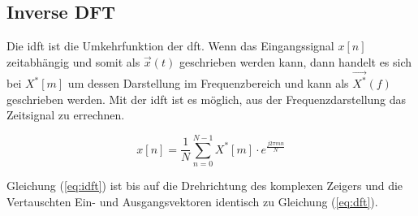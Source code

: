 \subsection{Inverse DFT}

Die \gls{idft} ist die Umkehrfunktion der \gls{dft}. Wenn das Eingangssignal $x[n]$ zeitabhängig und somit als $\vec{x}(t)$ geschrieben werden kann, dann handelt es sich bei $X^*[m]$ um
dessen Darstellung im Frequenzbereich und kann als $\vec{X^*}(f)$ geschrieben werden. Mit der \gls{idft} ist es möglich, aus der Frequenzdarstellung das Zeitsignal zu errechnen.

\begin{equation}\label{eq:idft}
 x \left[ n \right] = \frac{1}{N} \sum^{N-1}_{n=0} X^*[m] \cdot e^{\frac{j 2 \pi m n}{N}}
\end{equation}

Gleichung (\ref{eq:idft}) ist bis auf die Drehrichtung des komplexen Zeigers und die Vertauschten Ein- und Ausgangsvektoren identisch zu Gleichung (\ref{eq:dft}).
